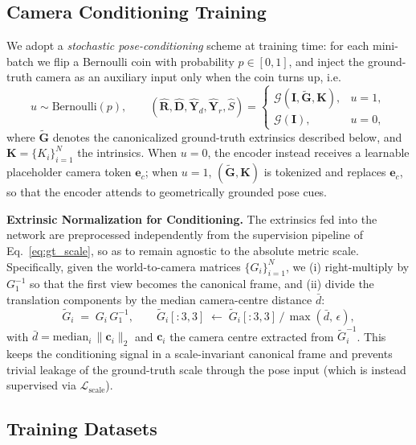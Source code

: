 \subsection{Camera Conditioning Training}
\label{sec:pose_cond}
We adopt a \emph{stochastic pose-conditioning} scheme at training time: for each mini-batch we flip a Bernoulli coin with probability $p\in[0,1]$, and inject the ground-truth camera as an auxiliary input only when the coin turns up, i.e.\
\begin{equation}
u \sim \mathrm{Bernoulli}(p),\qquad
(\hat{\mathbf{R}},\hat{\mathbf{D}},\hat{\mathbf{Y}}_d,\hat{\mathbf{Y}}_r,\hat{S}) =
\begin{cases}
\mathcal{G}(\mathbf{I},\tilde{\mathbf{G}},\mathbf{K}), & u=1,\\[2pt]
\mathcal{G}(\mathbf{I}), & u=0,
\end{cases}
\end{equation}
where $\tilde{\mathbf{G}}$ denotes the canonicalized ground-truth extrinsics described below, and $\mathbf{K}=\{K_i\}_{i=1}^{N}$ the intrinsics. When $u=0$, the encoder instead receives a learnable placeholder camera token $\mathbf{e}_c$; when $u=1$, $(\tilde{\mathbf{G}},\mathbf{K})$ is tokenized and replaces $\mathbf{e}_c$, so that the encoder attends to geometrically grounded pose cues.

\noindent\textbf{Extrinsic Normalization for Conditioning.}
The extrinsics fed into the network are preprocessed independently from the supervision pipeline of Eq.~\eqref{eq:gt_scale}, so as to remain agnostic to the absolute metric scale. Specifically, given the world-to-camera matrices $\{G_i\}_{i=1}^{N}$, we (i) right-multiply by $G_1^{-1}$ so that the first view becomes the canonical frame, and (ii) divide the translation components by the median camera-centre distance $\bar{d}$:
\begin{equation}
\tilde{G}_i \;=\; G_i\,G_1^{-1},\qquad
\tilde{G}_i[{:}3,3] \;\leftarrow\; \tilde{G}_i[{:}3,3]\,/\,\max(\bar{d},\,\epsilon),
\end{equation}
with $\bar{d}=\mathrm{median}_i\,\|\mathbf{c}_i\|_2$ and $\mathbf{c}_i$ the camera centre extracted from $\tilde{G}_i^{-1}$. This keeps the conditioning signal in a scale-invariant canonical frame and prevents trivial leakage of the ground-truth scale through the pose input (which is instead supervised via $\mathcal{L}_{\text{scale}}$).

\subsection{Training Datasets}

